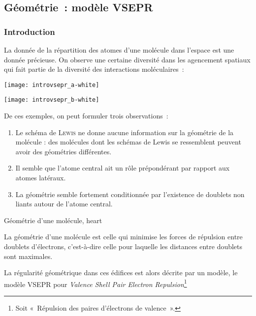 \documentclass[../main/main.tex]{subfiles}
\begin{document}
\subsection{Géométrie~: modèle VSEPR}
\subsubsection{Introduction}

La donnée de la répartition des atomes d'une molécule dans l'espace est une
donnée précieuse. On observe une certaine diversité dans les agencement spatiaux
qui fait partie de la diversité des interactions moléculaires~:
\begin{center}
    \texttt{[image: introvsepr\_a-white]}
\end{center}
\begin{center}
    \texttt{[image: introvsepr\_b-white]}
\end{center}
De ces exemples, on peut formuler trois observations~:
\begin{enumerate}
    \item Le schéma de \textsc{Lewis} ne donne aucune information sur la
        géométrie de la molécule : des molécules dont les schémas de Lewis se
        ressemblent peuvent avoir des géométries différentes.
    \item Il semble que l'atome central ait un rôle prépondérant par rapport aux
        atomes latéraux.
    \item La géométrie semble fortement conditionnée par l'existence de doublets
        non liants autour de l'atome central.
\end{enumerate}

\begin{tror}{Géométrie d'une molécule, heart}
    \begin{center}
        La géométrie d'une molécule est celle qui minimise les forces de
        répulsion entre doublets d'électrons, c'est-à-dire celle pour laquelle
        les distances entre doublets sont maximales.
    \end{center}
\end{tror}

La régularité géométrique dans ces édifices est alors décrite par un modèle, le
modèle VSEPR pour \textit{Valence Shell Pair Electron Repulsion}\footnote{Soit
«~Répulsion des paires d'électrons de valence~».}
\end{document}
